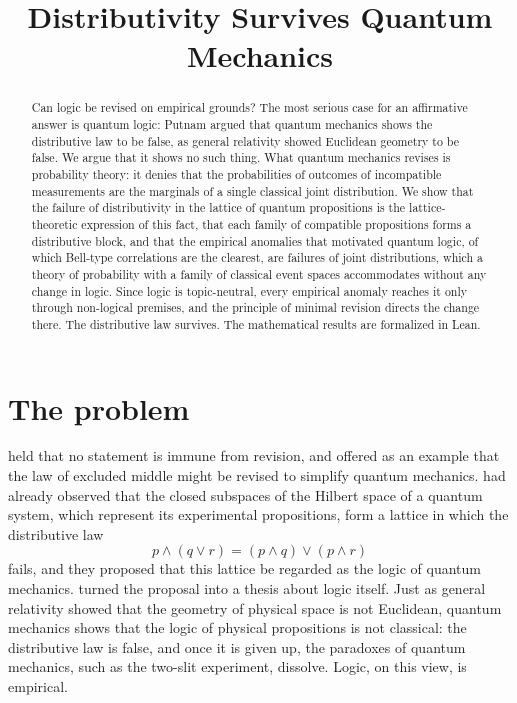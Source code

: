 \documentclass{situationist-preprint}
\title{Distributivity Survives Quantum Mechanics}
\begin{document}
\maketitle

\begin{abstract}
Can logic be revised on empirical grounds? The most serious case for an affirmative answer is quantum logic: Putnam argued that quantum mechanics shows the distributive law to be false, as general relativity showed Euclidean geometry to be false. We argue that it shows no such thing. What quantum mechanics revises is probability theory: it denies that the probabilities of outcomes of incompatible measurements are the marginals of a single classical joint distribution. We show that the failure of distributivity in the lattice of quantum propositions is the lattice-theoretic expression of this fact, that each family of compatible propositions forms a distributive block, and that the empirical anomalies that motivated quantum logic, of which Bell-type correlations are the clearest, are failures of joint distributions, which a theory of probability with a family of classical event spaces accommodates without any change in logic. Since logic is topic-neutral, every empirical anomaly reaches it only through non-logical premises, and the principle of minimal revision directs the change there. The distributive law survives. The mathematical results are formalized in Lean.
\end{abstract}

\section{The problem}

\citet{Quine1951} held that no statement is immune from revision, and offered as an example that the law of excluded middle might be revised to simplify quantum mechanics. \citet{BirkhoffVonNeumann1936} had already observed that the closed subspaces of the Hilbert space of a quantum system, which represent its experimental propositions, form a lattice in which the distributive law
\[
p \wedge (q \vee r) = (p \wedge q) \vee (p \wedge r)
\]
fails, and they proposed that this lattice be regarded as the logic of quantum mechanics. \citet{Putnam1968} turned the proposal into a thesis about logic itself. Just as general relativity showed that the geometry of physical space is not Euclidean, quantum mechanics shows that the logic of physical propositions is not classical: the distributive law is false, and once it is given up, the paradoxes of quantum mechanics, such as the two-slit experiment, dissolve. Logic, on this view, is empirical.
\end{document}
